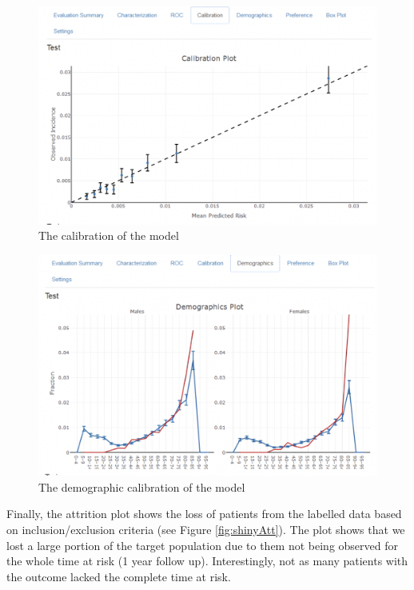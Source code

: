 \documentclass[11pt]{book}
\theoremstyle{definition}
\theoremstyle{definition}
\theoremstyle{definition}
\theoremstyle{remark}
\begin{document}
\begin{figure}

{\centering \includegraphics[width=1\linewidth]{images/PatientLevelPrediction/shiny/singleShiny/singleShinyCal} 

}

\caption{The calibration of the model}\label{fig:shinyCal}
\end{figure}

\begin{figure}

{\centering \includegraphics[width=1\linewidth]{images/PatientLevelPrediction/shiny/singleShiny/singleShinyDemo} 

}

\caption{The demographic calibration of the model}\label{fig:shinyDemo}
\end{figure}

Finally, the attrition plot shows the loss of patients from the labelled data based on inclusion/exclusion criteria (see Figure \ref{fig:shinyAtt}). The plot shows that we lost a large portion of the target population due to them not being observed for the whole time at risk (1 year follow up). Interestingly, not as many patients with the outcome lacked the complete time at risk.
\end{document}
